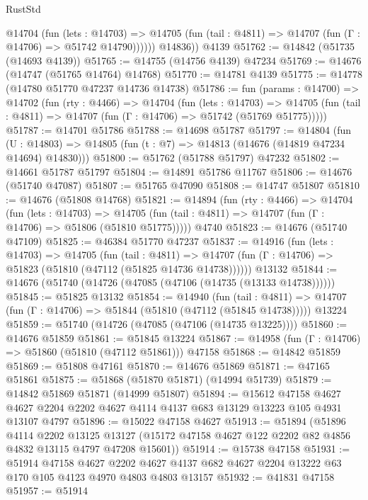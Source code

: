 \begin{lexlean}{RustStd}
\begin{coremodule}
            @14704
              (fun (lets : @14703) =>
              @14705 (fun (tail : @4811) => @14707 (fun (Γ : @14706) => @51742 @14790))))))
        @14836))
    @4139
@51762 := @14842 (@51735 (@14693 @4139))
@51765 := @14755 (@14756 @4139) @47234
@51769 := @14676 (@14747 (@51765 @14764) @14768)
@51770 := @14781 @4139
@51775 := @14778 (@14780 @51770 @47237 @14736 @14738)
@51786 := fun (params : @14700) =>
  @14702
    (fun (rty : @4466) =>
    @14704
      (fun (lets : @14703) =>
      @14705 (fun (tail : @4811) => @14707 (fun (Γ : @14706) => @51742 (@51769 @51775)))))
@51787 := @14701 @51786
@51788 := @14698 @51787
@51797 := @14804
    (fun (U : @14803) => @14805 (fun (t : @7) => @14813 (@14676 (@14819 @47234 @14694) @14830)))
@51800 := @51762 (@51788 @51797) @47232
@51802 := @14661 @51787 @51797
@51804 := @14891 @51786 @11767
@51806 := @14676 (@51740 @47087)
@51807 := @51765 @47090
@51808 := @14747 @51807
@51810 := @14676 (@51808 @14768)
@51821 := @14894
    (fun (rty : @4466) =>
    @14704
      (fun (lets : @14703) =>
      @14705 (fun (tail : @4811) => @14707 (fun (Γ : @14706) => @51806 (@51810 @51775)))))
    @4740
@51823 := @14676 (@51740 @47109)
@51825 := @46384 @51770 @47237
@51837 := @14916
    (fun (lets : @14703) =>
    @14705
      (fun (tail : @4811) =>
      @14707 (fun (Γ : @14706) => @51823 (@51810 (@47112 (@51825 @14736 @14738))))))
    @13132
@51844 := @14676 (@51740 (@14726 (@47085 (@47106 (@14735 (@13133 @14738))))))
@51845 := @51825 @13132
@51854 := @14940
    (fun (tail : @4811) => @14707 (fun (Γ : @14706) => @51844 (@51810 (@47112 (@51845 @14738)))))
    @13224
@51859 := @51740 (@14726 (@47085 (@47106 (@14735 @13225))))
@51860 := @14676 @51859
@51861 := @51845 @13224
@51867 := @14958 (fun (Γ : @14706) => @51860 (@51810 (@47112 @51861))) @47158
@51868 := @14842 @51859
@51869 := @51808 @47161
@51870 := @14676 @51869
@51871 := @47165 @51861
@51875 := @51868 (@51870 @51871) (@14994 @51739)
@51879 := @14842 @51869 @51871 (@14999 @51807)
@51894 := @15612
    @47158
    @4627
    @4627
    @2204
    @2202
    @4627
    @4114
    @4137
    @683
    @13129
    @13223
    @105
    @4931
    @13107
    @4797
@51896 := @15022 @47158 @4627
@51913 := @51894
    (@51896
      @4114
      @2202
      @13125
      @13127
      (@15172 @47158 @4627 @122 @2202 @82 @4856 @4832 @13115 @4797 @47208 @15601))
@51914 := @15738 @47158
@51931 := @51914
    @47158
    @4627
    @2202
    @4627
    @4137
    @682
    @4627
    @2204
    @13222
    @63
    @170
    @105
    @4123
    @4970
    @4803
    @4803
    @13157
@51932 := @41831 @47158
@51957 := @51914

\end{coremodule}
\end{lexlean}
